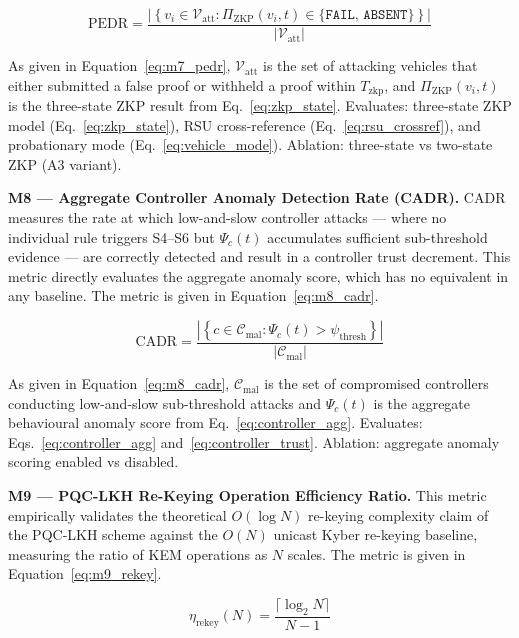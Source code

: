 \documentclass[12pt, a4paper]{report}
\newcommand{\mypar}{\vspace{0.8em}\noindent}
\begin{document}
\begin{equation}
\label{eq:m7_pedr}
\text{PEDR} =
\frac{\left|\left\{
v_i \in \mathcal{V}_{\text{att}} :
\Pi_{\text{ZKP}}(v_i, t)
\in \{\texttt{FAIL},\,\texttt{ABSENT}\}
\right\}\right|}
{|\mathcal{V}_{\text{att}}|}
\end{equation}

As given in Equation~\eqref{eq:m7_pedr}, $\mathcal{V}_{\text{att}}$ is
the set of attacking vehicles that either submitted a false proof or
withheld a proof within $T_{\text{zkp}}$, and $\Pi_{\text{ZKP}}(v_i,t)$
is the three-state ZKP result from Eq.~\eqref{eq:zkp_state}. Evaluates:
three-state ZKP model (Eq.~\eqref{eq:zkp_state}), RSU cross-reference
(Eq.~\eqref{eq:rsu_crossref}), and probationary mode
(Eq.~\eqref{eq:vehicle_mode}). Ablation: three-state vs two-state ZKP
(A3 variant).

\mypar
\textbf{M8 --- Aggregate Controller Anomaly Detection Rate (CADR).}
CADR measures the rate at which low-and-slow controller attacks — where
no individual rule triggers S4--S6 but $\Psi_c(t)$ accumulates sufficient
sub-threshold evidence — are correctly detected and result in a controller
trust decrement. This metric directly evaluates the aggregate anomaly
score, which has no equivalent in any baseline. The metric is given in
Equation~\eqref{eq:m8_cadr}.

\begin{equation}
\label{eq:m8_cadr}
\text{CADR} =
\frac{\left|\left\{
c \in \mathcal{C}_{\text{mal}} :
\Psi_c(t) > \psi_{\text{thresh}}
\right\}\right|}
{|\mathcal{C}_{\text{mal}}|}
\end{equation}

As given in Equation~\eqref{eq:m8_cadr}, $\mathcal{C}_{\text{mal}}$ is
the set of compromised controllers conducting low-and-slow sub-threshold
attacks and $\Psi_c(t)$ is the aggregate behavioural anomaly score from
Eq.~\eqref{eq:controller_agg}. Evaluates:
Eqs.~\eqref{eq:controller_agg} and~\eqref{eq:controller_trust}. Ablation:
aggregate anomaly scoring enabled vs disabled.

\mypar
\textbf{M9 --- PQC-LKH Re-Keying Operation Efficiency Ratio.}
This metric empirically validates the theoretical $O(\log N)$ re-keying
complexity claim of the PQC-LKH scheme against the $O(N)$ unicast Kyber
re-keying baseline, measuring the ratio of KEM operations as $N$ scales.
The metric is given in Equation~\eqref{eq:m9_rekey}.

\begin{equation}
\label{eq:m9_rekey}
\eta_{\text{rekey}}(N) =
\frac{\lceil \log_2 N \rceil}{N - 1}
\end{equation}
\end{document}
